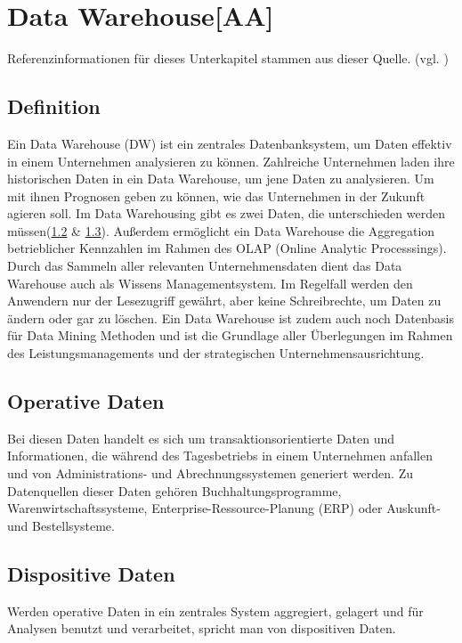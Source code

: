 \newpage
\section{Data Warehouse[AA]}\label{ssec:dw}
Referenzinformationen für dieses Unterkapitel stammen aus dieser Quelle. (vgl. \cite{ionis_dwh_2020})
\subsection{Definition}
Ein Data Warehouse (DW) ist ein zentrales Datenbanksystem, um Daten effektiv in einem Unternehmen analysieren zu können. Zahlreiche Unternehmen laden ihre historischen Daten in ein Data Warehouse, um jene Daten zu analysieren. Um mit ihnen Prognosen geben zu können, wie das Unternehmen in der Zukunft agieren soll. Im Data Warehousing gibt es zwei Daten, die unterschieden werden müssen(\ref{ssec:Operative-Daten} \& \ref{ssec:Dispositive-Daten}). Außerdem ermöglicht ein Data Warehouse die Aggregation betrieblicher Kennzahlen im Rahmen des OLAP (Online Analytic Processsings).\\
Durch das Sammeln aller relevanten Unternehmensdaten dient das Data Warehouse auch als Wissens Managementsystem. Im Regelfall werden den Anwendern nur der Lesezugriff gewährt, aber keine Schreibrechte, um Daten zu ändern oder gar zu löschen. Ein Data Warehouse ist zudem auch noch Datenbasis für Data Mining Methoden und ist die Grundlage aller Überlegungen im Rahmen des Leistungsmanagements und der strategischen Unternehmensausrichtung.
\subsection{Operative Daten}\label{ssec:Operative-Daten}
Bei diesen Daten handelt es sich um transaktionsorientierte Daten und Informationen, die während des Tagesbetriebs in einem Unternehmen anfallen und von Administrations- und Abrechnungssystemen generiert werden. Zu Datenquellen dieser Daten gehören Buchhaltungsprogramme, Warenwirtschaftssysteme, Enterprise-Ressource-Planung (ERP) oder Auskunft- und Bestellsysteme.
\subsection{Dispositive Daten}\label{ssec:Dispositive-Daten}
Werden operative Daten in ein zentrales System aggregiert, gelagert und für Analysen benutzt und verarbeitet, spricht man von dispositiven Daten.
\newpage
